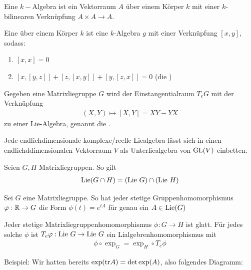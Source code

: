 \documentclass{report}
\begin{document}
\begin{definition}
	Eine $k-$Algebra ist ein Vektorraum $A$ über einem Körper $k$ mit einer $k$-bilinearen Verknüpfung $A \times A \to A$.
\end{definition}
\begin{definition}
	Eine  über einem Körper $k$ ist eine $k$-Algebra $g$ mit einer Verknüpfung $[x,y]$, sodass:
	\begin{enumerate}
		\item $[x,x] = 0$
		\item $[x,[y,z]] + [z,[x,y]] + [y,[z,x]] = 0$ (die )
	\end{enumerate}
\end{definition}
\begin{theorem}
	Gegeben eine Matrixliegruppe $G$ wird der Einstangentialraum $T_eG$ mit der Verknüpfung
	\begin{align*}
		(X,Y) \mapsto [X,Y] = XY - YX
	\end{align*}
	zu einer Lie-Algebra, genannt die .
\end{theorem}
\begin{proposition}
	Jede endlichdimensionale komplexe/reelle Liealgebra lässt sich in einen endlichddimensionalen Vektorraum $V$ als Unterliealgebra von $\textnormal{GL}(V)$ einbetten.
\end{proposition}
\begin{proposition}
	Seien $G,H$ Matrixliegruppen. So gilt
	\begin{align*}
		\textnormal{Lie}(G \cap H) = (\textnormal{Lie}~ G) \cap (\textnormal{Lie}~ H)
	\end{align*}
\end{proposition}
\begin{theorem}
	Sei $G$ eine Matrixliegruppe. So hat jeder stetige Gruppenhomomorphismus $\varphi : \mathbb{R} \to G$ die Form $\phi(t) = e^{tA}$ für genau ein $A \in \textnormal{Lie}(G)$
\end{theorem}
\begin{theorem}
	Jeder stetige Matrixliegruppenhomomorphismus $\phi: G \to H$ ist glatt. Für jedes solche $\phi$ ist $T_e\varphi : \textnormal{Lie}~G \to \textnormal{Lie}~G$ ein Lialgebrenhomomorphismus mit
	\begin{align*}
		\phi \circ \exp_G = \exp_H \circ T_e\phi
	\end{align*}
\end{theorem}
Beispiel: Wir hatten bereits $\exp(\textnormal{tr} A) = \det \exp(A)$, also folgendes Diagramm:
\end{document}
